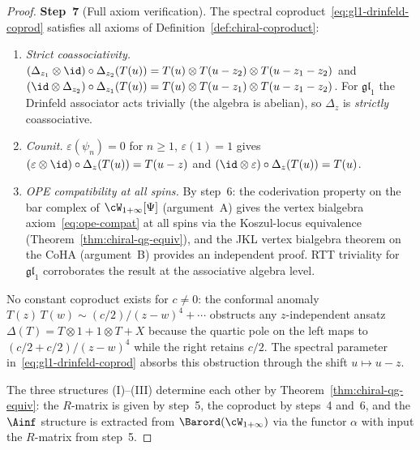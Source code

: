 \begin{proof}
\medskip
\noindent
\textbf{Step~7}
(Full axiom verification).
The spectral coproduct~\eqref{eq:gl1-drinfeld-coprod}
satisfies all axioms of
Definition~\ref{def:chiral-coproduct}:
\begin{enumerate}[label=\textup{(\alph*)}]
\item \emph{Strict coassociativity.}
  $(\Delta_{z_1} \otimes \id) \circ \Delta_{z_2}(T(u))
  = T(u) \otimes T(u - z_2) \otimes T(u - z_1 - z_2)$
  and
  $(\id \otimes \Delta_{z_2}) \circ \Delta_{z_1}(T(u))
  = T(u) \otimes T(u - z_1) \otimes T(u - z_1 - z_2)$.
  For $\mathfrak{gl}_1$ the Drinfeld associator
  acts trivially (the algebra is abelian), so
  $\Delta_z$ is \emph{strictly} coassociative.
\item \emph{Counit.}
  $\varepsilon(\psi_n) = 0$ for $n \geq 1$,
  $\varepsilon(1) = 1$ gives
  $(\varepsilon \otimes \id) \circ \Delta_z(T(u))
  = T(u - z)$ and
  $(\id \otimes \varepsilon) \circ \Delta_z(T(u))
  = T(u)$.
\item \emph{OPE compatibility at all spins.}
  By step~6: the coderivation property on the bar complex
  of $\cW_{1+\infty}[\Psi]$ (argument~A) gives the vertex
  bialgebra axiom~\eqref{eq:ope-compat} at all spins via
  the Koszul-locus equivalence
  (Theorem~\ref{thm:chiral-qg-equiv}), and the JKL vertex
  bialgebra theorem on the CoHA (argument~B) provides an
  independent proof. RTT triviality for $\mathfrak{gl}_1$
  corroborates the result at the associative algebra level.
\end{enumerate}
No constant coproduct exists for $c \neq 0$: the
conformal anomaly $T(z)\,T(w) \sim (c/2)/(z-w)^4 +
\cdots$ obstructs any $z$-independent ansatz
$\Delta(T) = T \otimes 1 + 1 \otimes T + X$
because the quartic pole on the left maps to
$(c/2 + c/2)/(z-w)^4$ while the right retains $c/2$.
The spectral parameter in~\eqref{eq:gl1-drinfeld-coprod}
absorbs this obstruction through the shift
$u \mapsto u - z$.

The three structures (I)--(III) determine each other by
Theorem~\ref{thm:chiral-qg-equiv}: the $R$-matrix is
given by step~5, the coproduct by steps~4 and~6, and the
$\Ainf$ structure is extracted from
$\Barord(\cW_{1+\infty})$ via the functor $\alpha$
with input the $R$-matrix from step~5.
\end{proof}

